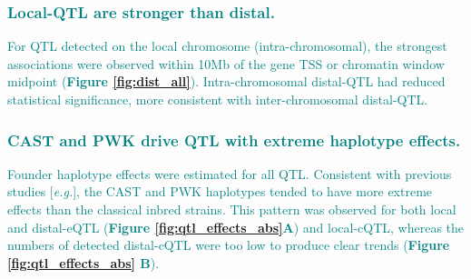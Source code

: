 \documentclass[9pt,twocolumn,twoside]{gsajnl}
\newcommand{\eg}{\emph{e.g.}\xspace}
\newcommand{\WV}[2]{\textcolor{red}{#1\footnote{\textcolor{red}{WV: #2}}}}
\newcommand{\GKinline}[1]{\textcolor{teal}{#1}}
\begin{document}
\subsubsection{\GKinline{Local-QTL are stronger than distal.}}
\GKinline{For QTL detected on the local chromosome (intra-chromosomal), the strongest associations were observed within 10Mb of the gene TSS or chromatin window midpoint (\textbf{Figure \ref{fig:dist_all}}). Intra-chromosomal distal-QTL had reduced statistical significance, more consistent with inter-chromosomal distal-QTL.} 


\subsubsection{\GKinline{CAST and PWK drive QTL with extreme haplotype effects.}}
\GKinline{Founder haplotype effects were estimated for all QTL. Consistent with previous studies [\eg \citet{Aylor2011}], the CAST and PWK haplotypes tended to have more extreme effects than the classical inbred strains. This pattern was observed for both local and distal-eQTL (\textbf{Figure \ref{fig:qtl_effects_abs}A}) and local-cQTL, whereas the numbers of detected distal-cQTL were too low to produce clear trends (\textbf{Figure \ref{fig:qtl_effects_abs} B}).}

\end{document}
